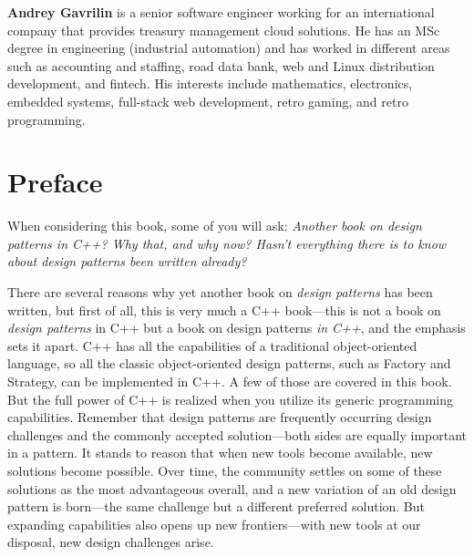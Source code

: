 \textbf{Andrey Gavrilin} is a senior software engineer working for an international company that provides treasury management cloud solutions. He has an MSc degree in engineering (industrial automation) and has worked in different areas such as accounting and staffing, road data bank, web and Linux distribution development, and fintech. His interests include mathematics, electronics, embedded systems, full-stack web development, retro gaming, and retro programming.

\protect{}\label{B19262_TOC_ePub.xhtml}{}

\protect{}\label{B19262_Preface.xhtml}{}

\section{Preface}

When considering this book, some of you will ask: \emph{Another book on design patterns in C++? Why that, and why now? Hasn't everything there is to know about design patterns been} \emph{written already?}

There are several reasons why yet another book on \emph{design} \emph{patterns} has been written, but first of all, this is very much a C++ book---this is not a book on \emph{design patterns} in C++ but a book on design patterns \emph{in C++}, and the emphasis sets it apart. C++ has all the capabilities of a traditional object-oriented language, so all the classic object-oriented design patterns, such as Factory and Strategy, can be implemented in C++. A few of those are covered in this book. But the full power of C++ is realized when you utilize its generic programming capabilities. Remember that design patterns are frequently occurring design challenges and the commonly accepted solution---both sides are equally important in a pattern. It stands to reason that when new tools become available, new solutions become possible. Over time, the community settles on some of these solutions as the most advantageous overall, and a new variation of an old design pattern is born---the same challenge but a different preferred solution. But expanding capabilities also opens up new frontiers---with new tools at our disposal, new design challenges arise.

